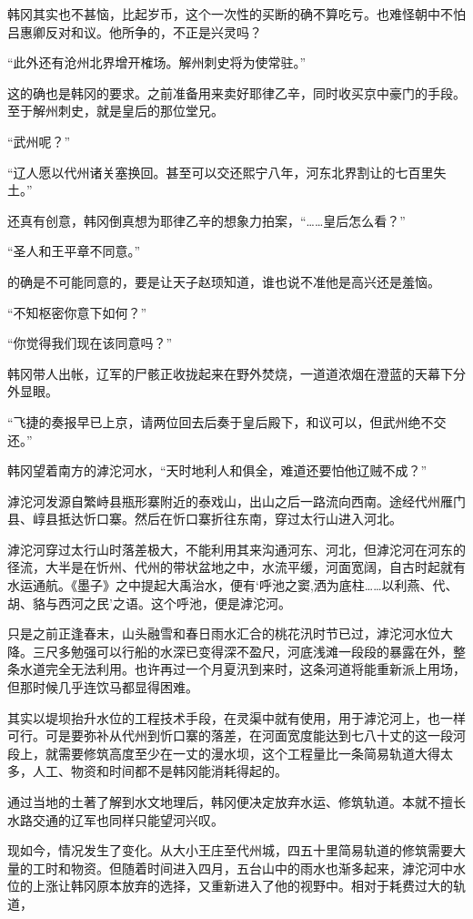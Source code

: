 韩冈其实也不甚恼，比起岁币，这个一次性的买断的确不算吃亏。也难怪朝中不怕吕惠卿反对和议。他所争的，不正是兴灵吗？

“此外还有沧州北界增开榷场。解州刺史将为使常驻。”

这的确也是韩冈的要求。之前准备用来卖好耶律乙辛，同时收买京中豪门的手段。至于解州刺史，就是皇后的那位堂兄。

“武州呢？”

“辽人愿以代州诸关塞换回。甚至可以交还熙宁八年，河东北界割让的七百里失土。”

还真有创意，韩冈倒真想为耶律乙辛的想象力拍案，“……皇后怎么看？”

“圣人和王平章不同意。”

的确是不可能同意的，要是让天子赵顼知道，谁也说不准他是高兴还是羞恼。

“不知枢密你意下如何？”

“你觉得我们现在该同意吗？”

韩冈带人出帐，辽军的尸骸正收拢起来在野外焚烧，一道道浓烟在澄蓝的天幕下分外显眼。

“飞捷的奏报早已上京，请两位回去后奏于皇后殿下，和议可以，但武州绝不交还。”

韩冈望着南方的滹沱河水，“天时地利人和俱全，难道还要怕他辽贼不成？”

滹沱河发源自繁峙县瓶形寨附近的泰戏山，出山之后一路流向西南。途经代州雁门县、崞县抵达忻口寨。然后在忻口寨折往东南，穿过太行山进入河北。

滹沱河穿过太行山时落差极大，不能利用其来沟通河东、河北，但滹沱河在河东的径流，大半是在忻州、代州的带状盆地之中，水流平缓，河面宽阔，自古时起就有水运通航。《墨子》之中提起大禹治水，便有‘呼池之窦,洒为底柱……以利燕、代、胡、貉与西河之民’之语。这个呼池，便是滹沱河。

只是之前正逢春末，山头融雪和春日雨水汇合的桃花汛时节已过，滹沱河水位大降。三尺多勉强可以行船的水深已变得深不盈尺，河底浅滩一段段的暴露在外，整条水道完全无法利用。也许再过一个月夏汛到来时，这条河道将能重新派上用场，但那时候几乎连饮马都显得困难。

其实以堤坝抬升水位的工程技术手段，在灵渠中就有使用，用于滹沱河上，也一样可行。可是要弥补从代州到忻口寨的落差，在河面宽度能达到七八十丈的这一段河段上，就需要修筑高度至少在一丈的漫水坝，这个工程量比一条简易轨道大得太多，人工、物资和时间都不是韩冈能消耗得起的。

通过当地的土著了解到水文地理后，韩冈便决定放弃水运、修筑轨道。本就不擅长水路交通的辽军也同样只能望河兴叹。

现如今，情况发生了变化。从大小王庄至代州城，四五十里简易轨道的修筑需要大量的工时和物资。但随着时间进入四月，五台山中的雨水也渐多起来，滹沱河中水位的上涨让韩冈原本放弃的选择，又重新进入了他的视野中。相对于耗费过大的轨道，

